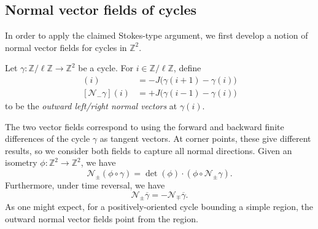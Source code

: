\subsection{Normal vector fields of cycles}

In order to apply the claimed Stokes-type argument, we first develop a notion of normal vector fields for cycles in $\mathbb{Z}^2$. 

\begin{definition}
  Let $\gamma \colon \mathbb{Z}/\ell\mathbb{Z} \to \mathbb{Z}^2$ be a cycle. For $i \in \mathbb{Z}/\ell\mathbb{Z}$, define
  \begin{align}
    [\mathcal{N}_+\gamma](i) &= -J\big(\gamma (i+1) - \gamma(i)\big) \\
    [\mathcal{N}_-\gamma](i) &= +J\big(\gamma (i-1) - \gamma(i)\big)
  \end{align}
  to be the \emph{outward left/right normal vectors} at $\gamma(i)$.
\end{definition}
The two vector fields correspond to using the forward and backward finite differences of the cycle $\gamma$ as tangent vectors. At corner points, these give different results, so we consider both fields to capture all normal directions. Given an isometry $\phi \colon \mathbb{Z}^2 \to \mathbb{Z}^2$, we have 
\begin{equation}
  \mathcal{N}_{\pm} (\phi \circ \gamma) = \det(\phi) \cdot (\phi \circ \mathcal{N}_{\pm} \gamma).
\end{equation}
Furthermore, under time reversal, we have 
\begin{equation}
  \mathcal{N}_{\pm} \overline{\gamma} = - \mathcal{N}_{\mp} \overline{\gamma}.
\end{equation}
As one might expect, for a positively-oriented cycle bounding a simple region, the outward normal vector fields point  from the region.

